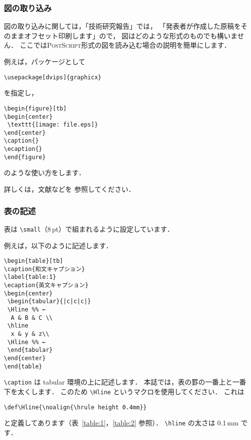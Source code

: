 \documentclass[technicalreport]{ieicej}
\newcommand{\PS}{{\scshape Post\-Script}}
\begin{document}
\subsubsection{図の取り込み}

図の取り込みに関しては，「技術研究報告」では，
「発表者が作成した原稿をそのままオフセット印刷します」ので，
図はどのような形式のものでも構いません．
ここでは\PS 形式の図を読み込む場合の説明を簡単にします．

例えば，パッケージとして
\begin{verbatim}
\usepackage[dvips]{graphicx}
\end{verbatim}
を指定し，
\begin{verbatim}
\begin{figure}[tb]
\begin{center}
 \texttt{[image: file.eps]}
\end{center}
\caption{}
\ecaption{}
\end{figure}
\end{verbatim}
のような使い方をします．

詳しくは，文献\cite{FMi1,latex,FMi2,Nakano,otobe,Okumura3,Eguchi}などを
参照してください．

\subsubsection{表の記述}

表は \verb/\small/（8\,pt）で組まれるように設定しています．

例えば，以下のように記述します．
\begin{verbatim}
\begin{table}[tb]
\caption{和文キャプション}
\label{table:1}
\ecaption{英文キャプション}
\begin{center}
 \begin{tabular}{|c|c|c|}
 \Hline %% ←
  A & B & C \\
 \hline
  x & y & z\\
 \Hline %% ←
 \end{tabular}
\end{center}
\end{table}
\end{verbatim}

\verb/\caption/ は tabular 環境の上に記述します．
本誌では，表の罫の一番上と一番下を太くします．
このため \verb/\Hline/ というマクロを使用してください．
これは
\begin{verbatim}
\def\Hline{\noalign{\hrule height 0.4mm}}
\end{verbatim}
と定義してあります（表~\ref{table:1}，\ref{table:2} 参照）．
\verb/\hline/ の太さは 0.1\,mm です．
\end{document}
